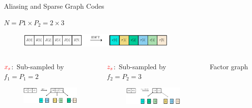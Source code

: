 \documentclass[10pt,xcolor=table]{beamer}
\begin{document}
	\begin{frame}{Aliasing and Sparse Graph Codes}
	
		\begin{block}{$N = P1 \times P_2 = 2 \times 3$}
			\begin{figure}[t]
				\centering
				\includegraphics[width=3.1in]{X_DFT}
			\end{figure}
		\end{block}
		
		\begin{columns}
			
			\begin{block}{{\small $\color{red}x_s$:\ Sub-sampled by $f_1=P_1=2$}}
				\begin{figure}[t]
					\centering
					\includegraphics[width=2.3in]{Xs}
				\end{figure}
			\end{block}
			
			\begin{block}{{\small$\color{red}z_s$:\ Sub-sampled by $f_2=P_2=3$}}
				\begin{figure}[t]
					\centering
					\includegraphics[width=2.3in]{Zs}
				\end{figure}
			\end{block}
			
			\begin{block}{\small Factor graph}
				\begin{figure}[t]
					\begin{center}
						\resizebox{1.0\textwidth}{!}{}
					\end{center}
				\end{figure}
			\end{block}
		\end{columns}
	\end{frame}
\end{document}
